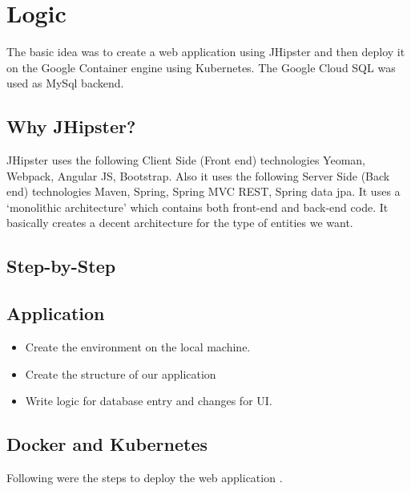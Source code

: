 \documentclass[a4paper]{article}
\begin{document}
\section{Logic}
The basic idea was to create a web application using JHipster and then deploy it on the Google Container engine using Kubernetes. The Google Cloud SQL was used as MySql backend.

\subsection{Why JHipster?}
JHipster uses the following Client Side (Front end) technologies
Yeoman, Webpack, Angular JS, Bootstrap.
Also it uses the following Server Side (Back end) technologies
Maven, Spring, Spring MVC REST, Spring data jpa.
It uses a ‘monolithic architecture’ which contains both front-end and back-end code.
It basically creates a decent architecture for the type of entities we want.

\subsection{Step-by-Step}
\subsection{Application}
\begin{itemize}
\item Create the environment on the local machine.
\item Create the structure of our application
\item Write logic for database entry and changes for UI.
\end{itemize}

\subsection{Docker and Kubernetes}

Following were the steps to deploy the web application \cite{docker}\cite{kubernetes}.
\end{document}
